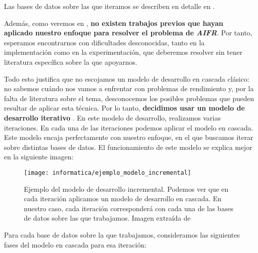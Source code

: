 Las bases de datos sobre las que iteramos se describen en detalle en .

Además, como veremos en , \textbf{no existen trabajos previos que hayan aplicado nuestro enfoque para resolver el problema de \textit{AIFR}}. Por tanto, esperamos encontrarnos con dificultades desconocidas, tanto en la implementación como en la experimentación, que deberemos resolver sin tener literatura específica sobre la que apoyarnos.

Todo esto justifica que no escojamos un modelo de desarrollo en cascada clásico: no sabemos cuándo nos vamos a enfrentar con problemas de rendimiento y, por la falta de literatura sobre el tema, desconocemos los posibles problemas que pueden resultar de aplicar esta técnica. Por lo tanto, \textbf{decidimos usar un modelo de desarrollo iterativo} \cite{informatica:libro_metodologias_desarrollo}. En este modelo de desarrollo, realizamos varias iteraciones. En cada una de las iteraciones podemos aplicar el modelo en cascada. Este modelo encaja perfectamente con nuestro enfoque, en el que buscamos iterar sobre distintas bases de datos. El funcionamiento de este modelo se explica mejor en la siguiente imagen:

\begin{figure}[H]
    \centering
    \texttt{[image: informatica/ejemplo\_modelo\_incremental]}
    \caption{Ejemplo del modelo de desarrollo incremental. Podemos ver que en cada iteración aplicamos un modelo de desarrollo en cascada. En nuestro caso, cada iteración corresponderá con cada una de las bases de datos sobre las que trabajamos. Imagen extraída de \cite{informatica:libro_metodologias_desarrollo}}
\end{figure}

Para cada base de datos sobre la que trabajamos, consideramos las siguientes fases del modelo en cascada para esa iteración:

